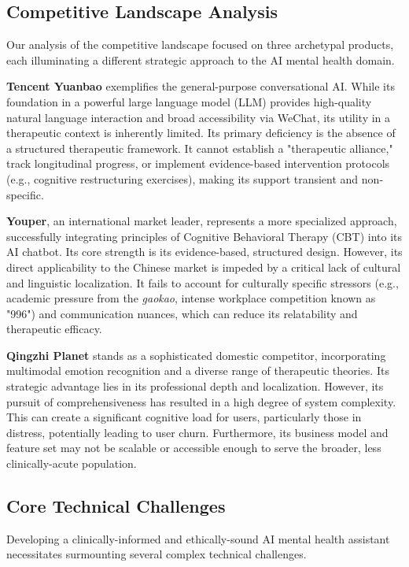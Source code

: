 \subsection{Competitive Landscape Analysis}

Our analysis of the competitive landscape focused on three archetypal products, each illuminating a different strategic approach to the AI mental health domain.

\textbf{Tencent Yuanbao} exemplifies the general-purpose conversational AI. While its foundation in a powerful large language model (LLM) provides high-quality natural language interaction and broad accessibility via WeChat, its utility in a therapeutic context is inherently limited. Its primary deficiency is the absence of a structured therapeutic framework. It cannot establish a "therapeutic alliance," track longitudinal progress, or implement evidence-based intervention protocols (e.g., cognitive restructuring exercises), making its support transient and non-specific.

\textbf{Youper}, an international market leader, represents a more specialized approach, successfully integrating principles of Cognitive Behavioral Therapy (CBT) into its AI chatbot. Its core strength is its evidence-based, structured design. However, its direct applicability to the Chinese market is impeded by a critical lack of cultural and linguistic localization. It fails to account for culturally specific stressors (e.g., academic pressure from the \textit{gaokao}, intense workplace competition known as "996") and communication nuances, which can reduce its relatability and therapeutic efficacy.

\textbf{Qingzhi Planet} stands as a sophisticated domestic competitor, incorporating multimodal emotion recognition and a diverse range of therapeutic theories. Its strategic advantage lies in its professional depth and localization. However, its pursuit of comprehensiveness has resulted in a high degree of system complexity. This can create a significant cognitive load for users, particularly those in distress, potentially leading to user churn. Furthermore, its business model and feature set may not be scalable or accessible enough to serve the broader, less clinically-acute population.

\subsection{Core Technical Challenges}

Developing a clinically-informed and ethically-sound AI mental health assistant necessitates surmounting several complex technical challenges.


